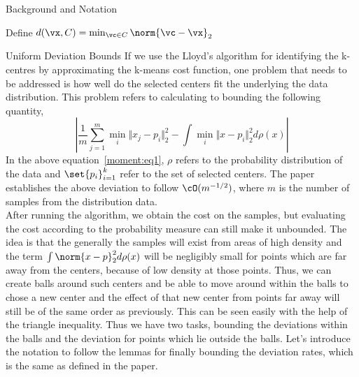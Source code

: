 \documentclass[10pt]{article}
\begin{document}
\begin{psection}{Background and Notation}

    Define $d(\vx, C) = \min_{\vc \in C} \norm{\vc - \vx}_2$

\end{psection}

\begin{psection}{Uniform Deviation Bounds}
    If we use the Lloyd's algorithm for identifying the k-centres by approximating the
    k-means cost function, one problem that needs to be addressed is how well do the
    selected centers fit the underlying the data distribution. This problem refers to
    calculating to bounding the following quantity,
    \begin{equation}
        \label{moment:eq1}
        \left\vert \frac{1}{m} \sum_{j=1}^m \min_i \Vert x_j - p_i \Vert^2_2 -\int \min_i \Vert x - p_i \Vert^2_2 d\rho(x)   \right\vert  
    \end{equation}
    In the above equation~\ref{moment:eq1}, $\rho$ refers to the probability
    distribution of the data and $\set{p_i}_{i=1}^{k}$ refer to the set of selected
    centers. The paper establishes the above deviation to follow $\cO (m^{-1/2})$, where
    $m$ is the number of samples from the distribution data. \\ After running the
    algorithm, we obtain the cost on the samples, but evaluating the cost according to
    the probability measure can still make it unbounded. The idea is that the generally
    the samples will exist from areas of high density and the term $\int \norm{x -
    p}^2_2 d\rho(x)$ will be negligibly small for points which are far away from the
    centers, because of low density at those points. Thus, we can create balls around
    such centers and be able to move around within the balls to chose a new center and
    the effect of that new center from points far away will still be of the same order
    as previously. This can be seen easily with the help of the triangle inequality.
    Thus we have two tasks, bounding the deviations within the balls and the deviation
    for points which lie outside the balls.  Let's introduce the notation to follow the
    lemmas for finally bounding the deviation rates, which is the same as defined in the
    paper.


\end{psection}
\end{document}
